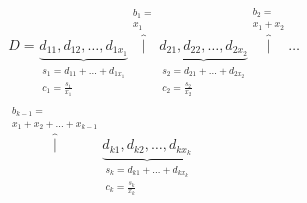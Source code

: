 \documentclass[conference,compsoc]{IEEEtran}
\newtheorem{proofprp}{}
\newtheorem{subprp}{Property}[proofprp]
\newtheorem{defn}[subprp]{Definition}
\begin{document}
\begin{equation}\label{alg-vis}\begin{aligned}
D=
\underbrace{d_{11}, d_{12}, \dots, d_{1x_1}}_{\substack{s_1 = d_{11} + \dots + d_{1x_1} \\  c_1 = \frac{s_1}{x_1}}}
\overbrace{|}^{\substack{b_1 = \\ x_1}}
\underbrace{d_{21}, d_{22}, \dots, d_{2x_2}}_{\substack{s_2 = d_{21} + \dots + d_{2x_2} \\  c_2 = \frac{s_2}{x_2}}}
\overbrace{|}^{\substack{b_2 = \\ x_1 + x_2}}
\dots \\
\overbrace{|}^{\substack{b_{k-1} = \\ x_1 + x_2 + \dots + x_{k-1}}}
\underbrace{d_{k1}, d_{k2}, \dots, d_{kx_k}}_{\substack{s_k = d_{k1} + \dots + d_{kx_k} \\  c_k = \frac{s_k}{x_k}}}
\end{aligned}
\end{equation}




        
\end{document}
